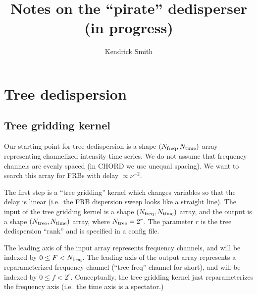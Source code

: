 \documentclass{article}
\title{Notes on the ``pirate'' dedisperser (in progress)}
\author{Kendrick Smith}
\numberwithin{equation}{section}   %
\begin{document}
\maketitle

\tableofcontents

\setlength{\parskip}{2.5pt}  %

\clearpage

\section{Tree dedispersion}
\label{sec:tree_dedispersion_top}

\subsection{Tree gridding kernel}
\label{sec:gridding}

Our starting point for tree dedispersion is a shape $(N_{\rm freq}, N_{\rm time})$ array representing channelized intensity time series. We do not assume that frequency channels are evenly spaced (in CHORD we use unequal spacing).
We want to search this array for FRBs with delay $\propto \nu^{-2}$.

The first step is a ``tree gridding'' kernel which changes variables so that the delay is linear (i.e.~the FRB dispersion sweep looks like a straight line).
The input of the tree gridding kernel is a shape $(N_{\rm freq}, N_{\rm time})$ array, and the output is a shape $(N_{\rm tree}, N_{\rm time})$ array, where $N_{\rm tree}=2^r$.
The parameter $r$ is the tree dedispersion ``rank'' and is specified in a config file.

The leading axis of the input array represents frequency channels, and will be indexed by $0 \le F < N_{\rm freq}$.
The leading axis of the output array represents a reparameterized frequency channel (``tree-freq'' channel for short), and will be indexed by $0\le f < 2^r$.
Conceptually, the tree gridding kernel just reparameterizes the frequency axis (i.e.\ the time axis is a spectator.)
\end{document}
